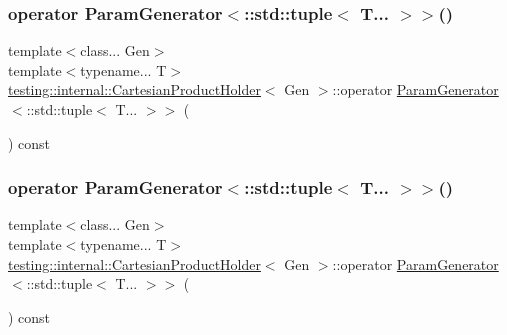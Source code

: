 \subsubsection{\texorpdfstring{operator ParamGenerator$<$::std::tuple$<$ T... $>$$>$()}{operator ParamGenerator<::std::tuple< T... >>()}\hspace{0.1cm}{\footnotesize\ttfamily [1/2]}}
{\footnotesize\ttfamily template$<$class... Gen$>$ \\
template$<$typename... T$>$ \\
\mbox{\hyperlink{classtesting_1_1internal_1_1_cartesian_product_holder}{testing\+::internal\+::\+Cartesian\+Product\+Holder}}$<$ Gen $>$\+::operator \mbox{\hyperlink{classtesting_1_1internal_1_1_param_generator}{Param\+Generator}}$<$\+::std\+::tuple$<$ T... $>$$>$ (\begin{DoxyParamCaption}{ }\end{DoxyParamCaption}) const\hspace{0.3cm}{\ttfamily [inline]}}

\mbox{\label{classtesting_1_1internal_1_1_cartesian_product_holder_ab29313123e08f3fc7111eac6e80351a5}} 
\subsubsection{\texorpdfstring{operator ParamGenerator$<$::std::tuple$<$ T... $>$$>$()}{operator ParamGenerator<::std::tuple< T... >>()}\hspace{0.1cm}{\footnotesize\ttfamily [2/2]}}
{\footnotesize\ttfamily template$<$class... Gen$>$ \\
template$<$typename... T$>$ \\
\mbox{\hyperlink{classtesting_1_1internal_1_1_cartesian_product_holder}{testing\+::internal\+::\+Cartesian\+Product\+Holder}}$<$ Gen $>$\+::operator \mbox{\hyperlink{classtesting_1_1internal_1_1_param_generator}{Param\+Generator}}$<$\+::std\+::tuple$<$ T... $>$$>$ (\begin{DoxyParamCaption}{ }\end{DoxyParamCaption}) const\hspace{0.3cm}{\ttfamily [inline]}}



